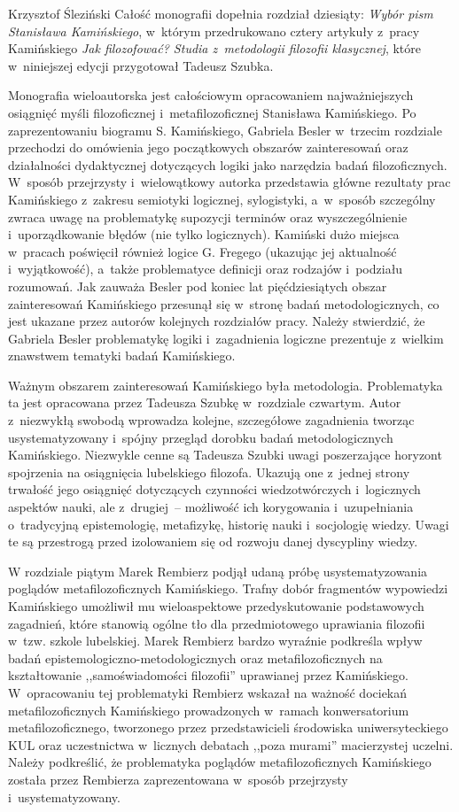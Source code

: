\begin{recplenv}{Krzysztof Śleziński}
Całość monografii dopełnia rozdział dziesiąty: \textit{Wybór pism Stanisława Kamińskiego}, w~którym przedrukowano cztery
artykuły z~pracy Kamińskiego \textit{Jak filozofować? Studia z~metodologii filozofii klasycznej}, które w~niniejszej
edycji przygotował Tadeusz Szubka.

Monografia wieloautorska jest całościowym opracowaniem najważniejszych osiągnięć myśli filozoficznej i~metafilozoficznej
Stanisława Kamińskiego. Po zaprezentowaniu biogramu S. Kamińskiego, Gabriela Besler w~trzecim rozdziale przechodzi do
omówienia jego początkowych obszarów zainteresowań oraz działalności dydaktycznej dotyczących logiki jako narzędzia
badań filozoficznych. W~sposób przejrzysty i~wielowątkowy autorka przedstawia główne rezultaty prac
Kamińskiego z~zakresu semiotyki logicznej, sylogistyki, a~w~sposób szczególny zwraca uwagę na problematykę supozycji terminów oraz
wyszczególnienie i~uporządkowanie błędów (nie tylko logicznych). Kamiński dużo miejsca w~pracach poświęcił również
logice G. Fregego (ukazując jej aktualność i~wyjątkowość), a~także problematyce definicji oraz rodzajów i~podziału
rozumowań. Jak zauważa Besler pod koniec lat pięćdziesiątych obszar zainteresowań Kamińskiego przesunął się w~stronę
badań metodologicznych, co jest ukazane przez autorów kolejnych rozdziałów pracy. Należy stwierdzić, że Gabriela Besler
problematykę logiki i~zagadnienia logiczne prezentuje z~wielkim znawstwem tematyki badań Kamińskiego. 

Ważnym obszarem zainteresowań Kamińskiego była metodologia. Problematyka ta jest opracowana przez Tadeusza
Szubkę w~rozdziale czwartym. Autor z~niezwykłą swobodą wprowadza kolejne, szczegółowe zagadnienia tworząc
usystematyzowany i~spójny przegląd dorobku badań metodologicznych Kamińskiego. Niezwykle cenne są Tadeusza Szubki
uwagi poszerzające
horyzont spojrzenia na osiągnięcia lubelskiego filozofa. Ukazują one z~jednej strony trwałość jego osiągnięć
dotyczących czynności wiedzotwórczych i~logicznych aspektów nauki, ale z~drugiej~-- możliwość ich
korygowania i~uzupełniania o~tradycyjną epistemologię, metafizykę, historię nauki i~socjologię wiedzy.
Uwagi te są przestrogą przed
izolowaniem się od rozwoju danej dyscypliny wiedzy.

W rozdziale piątym Marek Rembierz podjął udaną próbę usystematyzowania poglądów metafilozoficznych Kamińskiego. Trafny
dobór fragmentów wypowiedzi Kamińskiego umożliwił mu wieloaspektowe przedyskutowanie podstawowych zagadnień, które
stanowią ogólne tło dla przedmiotowego uprawiania filozofii w~tzw. szkole lubelskiej. Marek Rembierz bardzo wyraźnie
podkreśla wpływ badań epistemologiczno-metodologicznych oraz metafilozoficznych na kształtowanie ,,samoświadomości
filozofii'' uprawianej przez Kamińskiego. W~opracowaniu tej problematyki Rembierz wskazał na ważność dociekań
metafilozoficznych Kamińskiego prowadzonych w~ramach konwersatorium metafilozoficznego, tworzonego przez
przedstawicieli środowiska uniwersyteckiego KUL oraz uczestnictwa w~licznych debatach ,,poza murami'' macierzystej
uczelni. Należy podkreślić, że problematyka poglądów metafilozoficznych Kamińskiego została przez Rembierza
zaprezentowana w~sposób przejrzysty i~usystematyzowany.


\end{recplenv}
